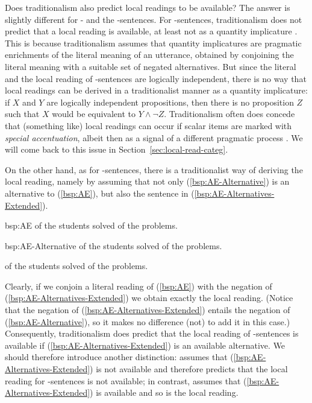 \documentclass[fleqn,reqno,10pt,draft]{article}
\newcommand{\as}{\acro{as}}
\renewcommand{\es}{\acro{es}}
\begin{document}
Does traditionalism also predict local readings to be available?  The
answer is slightly different for \as- and the \es-sentences. For
\es-sentences, traditionalism does not predict that a local reading is
available, at least not as a quantity implicature
\citep[c.f.][]{GeurtsPouscoulous2009:Embedded-Implic,ChemlaSpector2010:Experimental-Ev}. This
is because traditionalism assumes that quantity implicatures are
pragmatic enrichments of the literal meaning of an utterance, obtained
by conjoining the literal meaning with a suitable set of negated
alternatives. But since the literal and the local reading of
\es-sentences are logically independent, there is no way that local
readings can be derived in a traditionalist manner as a quantity
implicature: if $X$ and $Y$ are logically independent propositions,
then there is no proposition $Z$ such that $X$ would be equivalent to
$Y \wedge \neg Z$. Traditionalism often does concede that (something
like) local readings can occur if scalar items are marked with
\emph{special accentuation}, albeit then as a signal of a different
pragmatic process
\citep[e.g.][]{Horn2006:The-Border-Wars,Geurts2009:Scalar-Implicat,Geurts2010:Quantity-Implic}. We
will come back to this issue in Section~\ref{sec:local-read-categ}.

On the other hand, as for \as-sentences, there is a traditionalist way
of deriving the local reading, namely by assuming that not only
(\ref{bsp:AE-Alternative}) is an alternative to (\ref{bsp:AE}), but
also the sentence in (\ref{bsp:AE-Alternatives-Extended}).

\begin{exer}{bsp:AE}
  \ex {} of the students solved  of the problems.
\end{exer}

\begin{exer}{bsp:AE-Alternative}
  \ex {} of the students solved  of the problems.
\end{exer}

\begin{exe}
\ex \label{bsp:AE-Alternatives-Extended}  of the students solved  of the problems.
\end{exe}

\noindent Clearly, if we conjoin a literal reading of (\ref{bsp:AE})
with the negation of (\ref{bsp:AE-Alternatives-Extended}) we obtain
exactly the local reading. (Notice that the negation of
(\ref{bsp:AE-Alternatives-Extended}) entails the negation of
(\ref{bsp:AE-Alternative}), so it makes no difference (not) to add it
in this case.) Consequently, traditionalism does predict that the
local reading of \as-sentences is available if
(\ref{bsp:AE-Alternatives-Extended}) is an available alternative. We
should therefore introduce another distinction:  assumes that (\ref{bsp:AE-Alternatives-Extended}) is
not available and therefore predicts that the local reading for
\as-sentences is not available; in contrast,  assumes that (\ref{bsp:AE-Alternatives-Extended}) is
available and so is the local reading.
\end{document}
